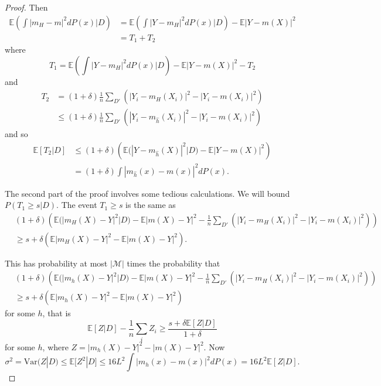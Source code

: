   \begin{proof}
    Then
    \begin{align}
      \mathbb{E} \left( \int |m_H - m|^2 dP(x)|D \right) &= \mathbb{E} \left( \int |Y - m_H|^2 dP(x)|D \right) - \mathbb{E}|Y - m(X)|^2 \\
      &= T_1 + T_2
    \end{align}
    where
    \begin{equation}
      T_1 = \mathbb{E} \left( \int |Y - m_H|^2 dP(x)|D \right) - \mathbb{E}|Y - m(X)|^2 - T_2
    \end{equation}
    and
    \begin{align}
      T_2 &= (1+\delta) \frac{1}{n} \sum_{D'} (|Y_i - m_H(X_i)|^2 - |Y_i - m(X_i)|^2) \\
      &\leq (1+\delta) \frac{1}{n} \sum_{D'} (|Y_i - m_{\hat{h}}(X_i)|^2 - |Y_i - m(X_i)|^2)
    \end{align}
    and so
    \begin{align}
      \mathbb{E}[T_2|D] &\leq (1 + \delta) \left( \mathbb{E}(|Y - m_{\hat{h}}(X)|^2|D) - \mathbb{E}|Y - m(X)|^2 \right) \\
      &= (1 + \delta) \int |m_{\hat{h}}(x) - m(x)|^2 dP(x).
    \end{align}

    The second part of the proof involves some tedious calculations. We will bound $P(T_1 \geq s|D)$. The event $T_1 \geq s$ is the same as
    \begin{align}
      &(1 + \delta) \left( \mathbb{E}(|m_H(X) - Y|^2|D) - \mathbb{E}|m(X) - Y|^2 - \frac{1}{n} \sum_{D'} (|Y_i - m_H(X_i)|^2 - |Y_i - m(X_i)|^2) \right) \\
      &\geq s + \delta \left( \mathbb{E}|m_H(X) - Y|^2 - \mathbb{E}|m(X) - Y|^2 \right).
    \end{align}

    This has probability at most $|\mathcal{M}|$ times the probability that
    \begin{align}
      &(1 + \delta) \left( \mathbb{E}(|m_h(X) - Y|^2|D) - \mathbb{E}|m(X) - Y|^2 - \frac{1}{n} \sum_{D'} (|Y_i - m_H(X_i)|^2 - |Y_i - m(X_i)|^2) \right) \\
      &\geq s + \delta \left( \mathbb{E}|m_h(X) - Y|^2 - \mathbb{E}|m(X) - Y|^2 \right)
    \end{align}
    for some $h$, that is
    \begin{equation}
      \mathbb{E}[Z|D] - \frac{1}{n} \sum_i Z_i \geq \frac{s + \delta\mathbb{E}[Z|D]}{1 + \delta}
    \end{equation}
    for some $h$, where $Z = |m_h(X) - Y|^2 - |m(X) - Y|^2$. Now
    \begin{equation}
      \sigma^2 = \text{Var}(Z|D) \leq \mathbb{E}[Z^2|D] \leq 16L^2 \int |m_h(x) - m(x)|^2 dP(x) = 16L^2 \mathbb{E}[Z|D].
    \end{equation}


\end{proof}
